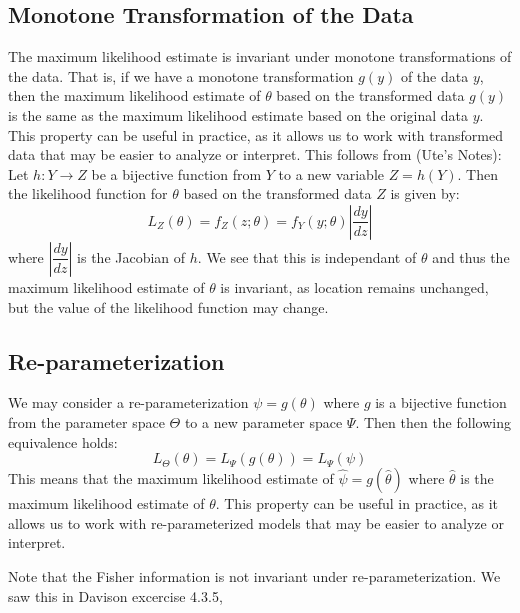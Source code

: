 \documentclass{article}
\theoremstyle{definition}
\theoremstyle{remark}
\begin{document}
\subsection{Monotone Transformation of the Data}
The maximum likelihood estimate is invariant under monotone transformations of the data. That is, if we have a monotone transformation $g(y)$ of the data $y$, then the maximum likelihood estimate of $\theta$ based on the transformed data $g(y)$ is the same as the maximum likelihood estimate based on the original data $y$. This property can be useful in practice, as it allows us to work with transformed data that may be easier to analyze or interpret. This follows from (Ute's Notes): \vspace{0.5cm}
Let $h : Y \to Z$ be a bijective function from $Y$ to a new variable $Z = h(Y)$. Then the likelihood function for $\theta$ based on the transformed data $Z$ is given by:
\begin{equation}
    L_Z(\theta) = f_Z(z; \theta) = f_Y(y; \theta) \left| \dfrac{dy}{dz} \right| 
\end{equation}
where $\left| \dfrac{dy}{dz} \right|$ is the Jacobian of $h$. We see that this is independant of $\theta$ and thus the maximum likelihood estimate of $\theta$ is invariant, as location remains unchanged, but the value of the likelihood function may change.

\subsection{Re-parameterization}
We may consider a re-parameterization $\psi = g(\theta)$ where $g$ is a bijective function from the parameter space $\Theta$ to a new parameter space $\Psi$. Then then the following equivalence holds:
\begin{equation}
    L_\Theta(\theta) = L_\Psi(g(\theta)) = L_\Psi(\psi)
\end{equation}
This means that the maximum likelihood estimate of $\hat{\psi} = g(\hat{\theta})$ where $\hat{\theta}$ is the maximum likelihood estimate of $\theta$. This property can be useful in practice, as it allows us to work with re-parameterized models that may be easier to analyze or interpret. \vspace{1em}

Note that the Fisher information is not invariant under re-parameterization. We saw this in Davison excercise 4.3.5,
\end{document}
